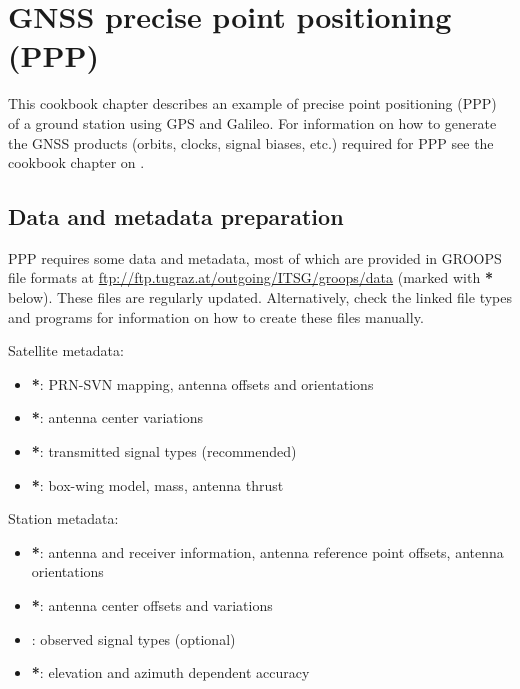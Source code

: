 \section{GNSS precise point positioning (PPP)}\label{cookbook.gnssPpp}

This cookbook chapter describes an example of precise point positioning (PPP) of a ground station using GPS and Galileo.
For information on how to generate the GNSS products (orbits, clocks, signal biases, etc.) required for PPP see the
cookbook chapter on .

\subsection{Data and metadata preparation}\label{cookbook.gnssPpp:metadata}

PPP requires some data and metadata, most of which are
provided in GROOPS file formats at \url{ftp://ftp.tugraz.at/outgoing/ITSG/groops/data}
(marked with \textbf{*} below). These files are regularly updated. Alternatively, check the linked
file types and programs for information on how to create these files manually.

Satellite metadata:
\begin{itemize}
  \item {}\textbf{*}: PRN-SVN mapping, antenna offsets and orientations
  \item {}\textbf{*}: antenna center variations
  \item {}\textbf{*}: transmitted signal types (recommended)
  \item {}\textbf{*}: box-wing model, mass, antenna thrust
\end{itemize}

Station metadata:
\begin{itemize}
  \item {}\textbf{*}: antenna and receiver information, antenna reference point
        offsets, antenna orientations
  \item {}\textbf{*}: antenna center offsets and variations
  \item {}: observed signal types (optional)
  \item {}\textbf{*}: elevation and azimuth dependent accuracy
\end{itemize}

